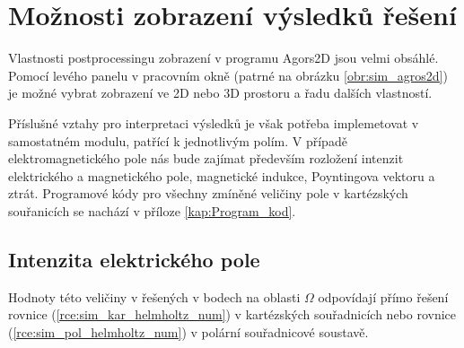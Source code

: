 \section{Možnosti zobrazení výsledků řešení}
Vlastnosti postprocessingu zobrazení v programu Agors2D jsou velmi obsáhlé. Pomocí levého panelu v pracovním okně (patrné na obrázku \ref{obr:sim_agros2d}) je možné vybrat zobrazení ve 2D nebo 3D prostoru a řadu dalších vlastností. 

Příslušné vztahy pro interpretaci výsledků je však potřeba implemetovat v samostatném modulu, patřící k jednotlivým polím. V případě elektromagnetického pole nás bude zajímat především rozložení intenzit elektrického a magnetického pole, magnetické indukce, Poyntingova vektoru a ztrát. Programové kódy pro všechny zmíněné veličiny pole v kartézských souřanicích se nachází v příloze \ref{kap:Program_kod}. 
 
\subsection*{Intenzita elektrického pole}
Hodnoty této veličiny v řešených v bodech na oblasti $\Omega$ odpovídají přímo řešení rovnice (\ref{rce:sim_kar_helmholtz_num}) v kartézských souřadnicích nebo rovnice (\ref{rce:sim_pol_helmholtz_num}) v polární souřadnicové soustavě.


